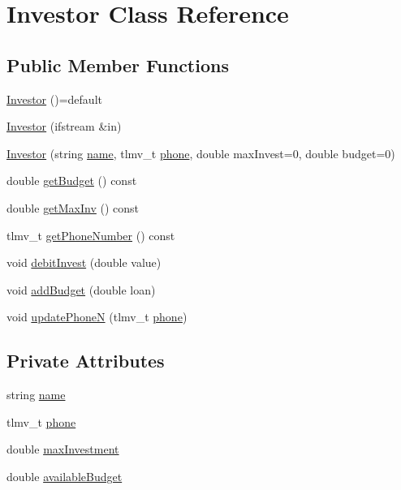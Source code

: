 \hypertarget{class_investor}{}\section{Investor Class Reference}
\label{class_investor}
\subsection*{Public Member Functions}
\begin{DoxyCompactItemize}
\item 
\hyperlink{class_investor_a7406bf2acbfd62cc9700c7a2256e6fc9}{Investor} ()=default
\item 
\hyperlink{class_investor_a8c7ac9bd11c105e5c5e8067f9670ac19}{Investor} (ifstream \&in)
\item 
\hyperlink{class_investor_a7d9c11dc51d3804ae26034dff94829f1}{Investor} (string \hyperlink{class_investor_a82fefdc76097ed0bd17f5131ccaee434}{name}, tlmv\+\_\+t \hyperlink{class_investor_a76caf9af875e152486a1b5cd80264119}{phone}, double max\+Invest=0, double budget=0)
\item 
double \hyperlink{class_investor_ab8bd4957a60050ab75c5d7c939c2fc50}{get\+Budget} () const
\item 
double \hyperlink{class_investor_a2ae3d2c4b2f002cf8a9cdbacb8515f35}{get\+Max\+Inv} () const
\item 
tlmv\+\_\+t \hyperlink{class_investor_a4cc2fa15276dc36061d6fd661bcbd644}{get\+Phone\+Number} () const
\item 
void \hyperlink{class_investor_a3ea286e2ea7ee73032bb526ad9f65b65}{debit\+Invest} (double value)
\item 
void \hyperlink{class_investor_a663245cdc55df66ee98e8f8c7f36bdcb}{add\+Budget} (double loan)
\item 
void \hyperlink{class_investor_a94e24cd52ee5f98a792bcaf73d39e2c8}{update\+PhoneN} (tlmv\+\_\+t \hyperlink{class_investor_a76caf9af875e152486a1b5cd80264119}{phone})
\end{DoxyCompactItemize}
\subsection*{Private Attributes}
\begin{DoxyCompactItemize}
\item 
string \hyperlink{class_investor_a82fefdc76097ed0bd17f5131ccaee434}{name}
\item 
tlmv\+\_\+t \hyperlink{class_investor_a76caf9af875e152486a1b5cd80264119}{phone}
\item 
double \hyperlink{class_investor_a5d49704cd0e79faf9515f101f1a02b59}{max\+Investment}
\item 
double \hyperlink{class_investor_a9e1c77689177032764b12761a132ac39}{available\+Budget}
\end{DoxyCompactItemize}
